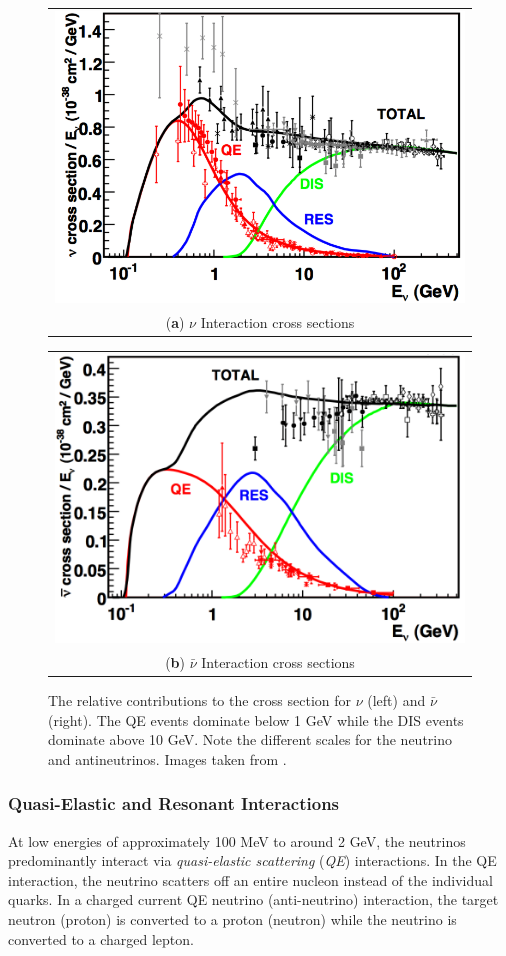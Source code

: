 \begin{figure}[h]
\centering
\begin{tabular}[b]{c}
  \includegraphics[width=0.45\linewidth]{nu_xsec_formaggio.png} \\
  \small (\textbf{\color{ctcolormain}a}) $\nu$ Interaction cross sections
\end{tabular} \hspace{2pt}
\begin{tabular}[b]{c}
  \includegraphics[width=0.45\linewidth]{nubar_xsec_formaggio.png} \\
  \small (\textbf{\color{ctcolormain}b}) $\bar{\nu}$ Interaction cross sections
\end{tabular}
\caption[QE, RES, and DIS cross sections for neutrinos]{The relative contributions to the cross section for $\nu$ (left) and $\bar{\nu}$ (right). The QE events dominate below 1 GeV while the DIS events dominate above 10 GeV. Note the different scales for the neutrino and antineutrinos. Images taken from \cite{Formaggio-Xsec}.}
\label{fig:xsec}
\end{figure}

\subsubsection{Quasi-Elastic and Resonant Interactions}
At low energies of approximately 100 MeV to around 2 GeV, the neutrinos predominantly interact via \emph{quasi-elastic scattering} (\emph{QE}) interactions.
In the QE interaction, the neutrino scatters off an entire nucleon instead of the individual quarks.
In a charged current QE neutrino (anti-neutrino) interaction, the target neutron (proton) is converted to a proton (neutron) while the neutrino is converted to a charged lepton.

